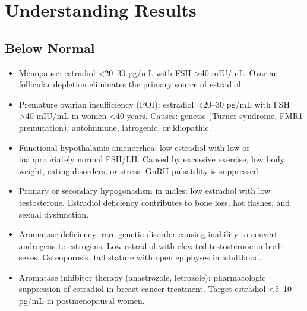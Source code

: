 \section*{Understanding Results}

\subsection*{Below Normal}
\begin{itemize}
  \item Menopause: estradiol <20--30 pg/mL with FSH >40 mIU/mL. Ovarian follicular depletion eliminates the primary source of estradiol.
  \item Premature ovarian insufficiency (POI): estradiol <20--30 pg/mL with FSH >40 mIU/mL in women <40 years. Causes: genetic (Turner syndrome, FMR1 premutation), autoimmune, iatrogenic, or idiopathic.
  \item Functional hypothalamic amenorrhea: low estradiol with low or inappropriately normal FSH/LH. Caused by excessive exercise, low body weight, eating disorders, or stress. GnRH pulsatility is suppressed.
  \item Primary or secondary hypogonadism in males: low estradiol with low testosterone. Estradiol deficiency contributes to bone loss, hot flashes, and sexual dysfunction.
  \item Aromatase deficiency: rare genetic disorder causing inability to convert androgens to estrogens. Low estradiol with elevated testosterone in both sexes. Osteoporosis, tall stature with open epiphyses in adulthood.
  \item Aromatase inhibitor therapy (anastrozole, letrozole): pharmacologic suppression of estradiol in breast cancer treatment. Target estradiol <5--10 pg/mL in postmenopausal women.
\end{itemize}

